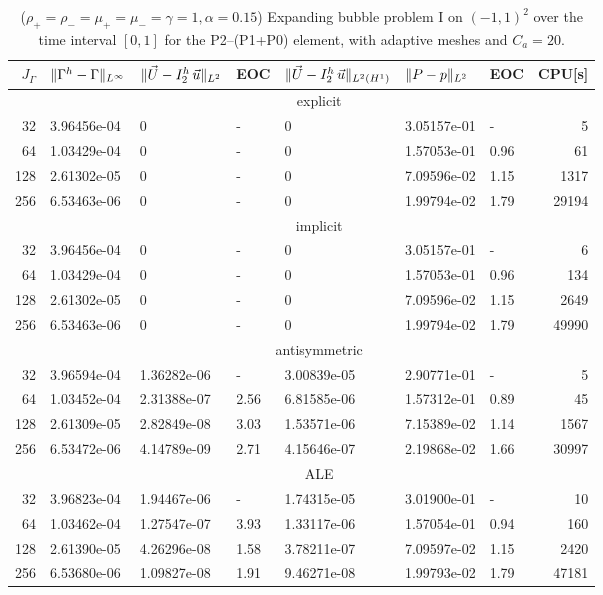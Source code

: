 \begin{table}
\center
\hspace*{-3.25cm}
\begin{tabular}{rllllllr}
\hline
$J_\Gamma$ & $\|\Gamma^h - \Gamma\|_{L^\infty}$ & $\|\vec U - I^h_{2}\,\vec u\|_{L^2}$ & EOC & $\|\vec U - I^h_{2}\,\vec u\|_{L^2(H^1)}$ & $\|P - p\|_{L^2}$ & EOC
& CPU[s] \\
\hline
& \multicolumn{7}{c}{explicit} \\
\hline
 32 & 3.96456e-04 & 0 & - & 0 & 3.05157e-01 &    - &     5 \\
 64 & 1.03429e-04 & 0 & - & 0 & 1.57053e-01 & 0.96 &    61 \\
128 & 2.61302e-05 & 0 & - & 0 & 7.09596e-02 & 1.15 &  1317 \\
256 & 6.53463e-06 & 0 & - & 0 & 1.99794e-02 & 1.79 & 29194 \\
\hline
& \multicolumn{7}{c}{implicit} \\
\hline
 32 & 3.96456e-04 & 0 & - & 0 & 3.05157e-01 &    - &     6 \\
 64 & 1.03429e-04 & 0 & - & 0 & 1.57053e-01 & 0.96 &   134 \\
128 & 2.61302e-05 & 0 & - & 0 & 7.09596e-02 & 1.15 &  2649 \\
256 & 6.53463e-06 & 0 & - & 0 & 1.99794e-02 & 1.79 & 49990 \\
\hline
& \multicolumn{7}{c}{antisymmetric} \\
\hline
 32 & 3.96594e-04 & 1.36282e-06 &    - & 3.00839e-05 & 2.90771e-01 &    - &
5 \\
 64 & 1.03452e-04 & 2.31388e-07 & 2.56 & 6.81585e-06 & 1.57312e-01 & 0.89 &
45 \\
128 & 2.61309e-05 & 2.82849e-08 & 3.03 & 1.53571e-06 & 7.15389e-02 & 1.14 &
1567 \\
256 & 6.53472e-06 & 4.14789e-09 & 2.71 & 4.15646e-07 & 2.19868e-02 & 1.66 &
30997 \\
\hline
& \multicolumn{7}{c}{ALE} \\
\hline
 32 & 3.96823e-04 & 1.94467e-06 &    - & 1.74315e-05 & 3.01900e-01 &    - &
10 \\
 64 & 1.03462e-04 & 1.27547e-07 & 3.93 & 1.33117e-06 & 1.57054e-01 & 0.94 &
160 \\
128 & 2.61390e-05 & 4.26296e-08 & 1.58 & 3.78211e-07 & 7.09597e-02 & 1.15 &
2420 \\
256 & 6.53680e-06 & 1.09827e-08 & 1.91 & 9.46271e-08 & 1.99793e-02 & 1.79 &
47181 \\
\hline
\end{tabular}
\hspace*{-3.25cm}
\caption[Navier--Stokes expanding bubble I errors P2--(P1+P0)]
{($\rho_+ = \rho_- = \mu_+ = \mu_- = \gamma = 1,\alpha=0.15$)
Expanding bubble problem I on $(-1,1)^2$ over the time interval $[0,1]$ for the
P2--(P1+P0) element, with adaptive meshes and $C_a=20$\textdegree.}
\label{tab:nsexpandingbubbleIp2p1p0}
\end{table}
